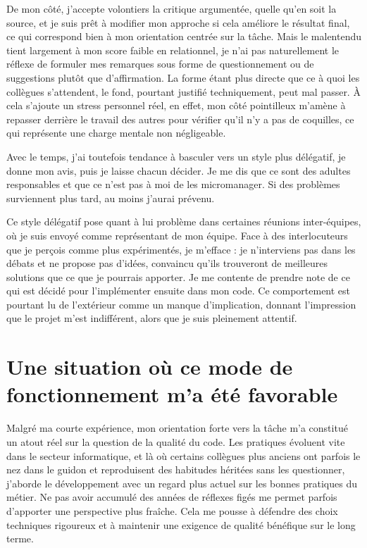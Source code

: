 \documentclass[12pt, a4paper]{article}
\begin{document}
De mon côté, j'accepte volontiers la critique argumentée, quelle qu'en soit la
source, et je suis prêt à modifier mon approche si cela améliore le résultat
final, ce qui correspond bien à mon orientation centrée sur la tâche. Mais le
malentendu tient largement à mon score faible en relationnel, je n'ai pas
naturellement le réflexe de formuler mes remarques sous forme de questionnement ou de
suggestions plutôt que
d'affirmation. La forme étant plus directe que ce à quoi les collègues s'attendent,
le fond, pourtant justifié techniquement, peut mal passer. À cela s'ajoute un
stress personnel réel, en effet, mon côté pointilleux m'amène à repasser derrière le travail
des autres pour vérifier qu'il n'y a pas de coquilles, ce qui représente une charge
mentale non négligeable.

Avec le temps, j'ai toutefois tendance à basculer vers un style plus délégatif,
je donne mon avis, puis je laisse chacun décider. Je me dis que ce sont des adultes
responsables et que ce n'est pas à moi de les micromanager. Si des problèmes
surviennent plus tard, au moins j'aurai prévenu.

Ce style délégatif pose quant à lui problème dans certaines réunions inter-équipes, où
je suis envoyé comme représentant de mon équipe. Face à des interlocuteurs
que je perçois comme plus expérimentés, je m'efface : je n'interviens pas dans les
débats et ne propose pas d'idées, convaincu qu'ils trouveront de meilleures solutions
que ce que je pourrais apporter. Je me contente de prendre note de ce qui est décidé
pour l'implémenter ensuite dans mon code. Ce comportement est pourtant lu de
l'extérieur comme un manque d'implication, donnant l'impression que le projet m'est
indifférent, alors que je suis pleinement attentif.

\section{Une situation où ce mode de fonctionnement m'a été favorable}
Malgré ma courte expérience, mon orientation forte vers la tâche m'a constitué
un atout réel sur la question de la qualité du code. Les pratiques évoluent vite
dans le secteur informatique, et là où certains collègues plus anciens ont parfois
le nez dans le guidon et reproduisent des habitudes héritées sans les questionner,
j'aborde le développement avec un regard plus actuel sur les bonnes pratiques du
métier. Ne pas avoir accumulé des années de réflexes figés me permet parfois
d'apporter une perspective plus fraîche. Cela me pousse à défendre des choix
techniques rigoureux et à maintenir une exigence de qualité bénéfique sur le
long terme.
\end{document}
